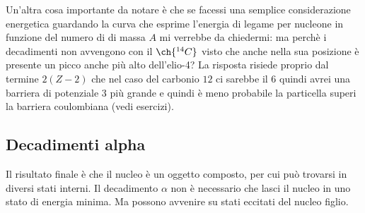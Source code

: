 Un'altra cosa importante da notare è che se facessi una semplice considerazione energetica guardando la curva che esprime l'energia di legame per nucleone in funzione del numero di di massa $A$ mi verrebbe da chiedermi: ma perchè i decadimenti non avvengono con il $\ch{^{14}C}$ visto che anche nella sua posizione è presente un picco anche più alto dell'elio-4? La risposta risiede proprio dal termine $2(Z-2)$ che nel caso del carbonio $12$ ci sarebbe il $6$ quindi avrei una barriera di potenziale $3$ più grande e quindi è meno probabile la particella superi la barriera coulombiana (vedi esercizi).
\subsection{Decadimenti alpha}
Il risultato finale è che il nucleo è un oggetto composto, per cui può trovarsi in diversi stati interni. Il decadimento $\alpha$ non è necessario che lasci il nucleo in uno stato di energia minima. Ma possono avvenire su stati eccitati del nucleo figlio.